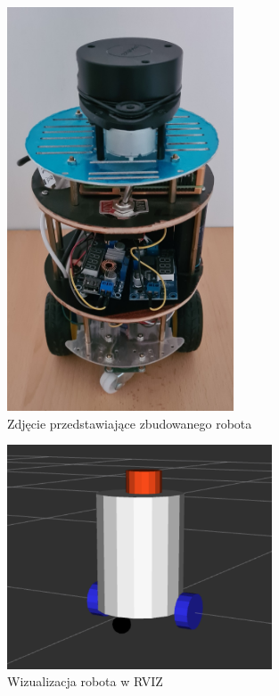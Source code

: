 \documentclass[a4paper,twoside,12pt]{book}
\begin{document}
\begin{figure}[!hb]
	\centering
	\includegraphics[width=0.6\textwidth]{images/robot.jpg}
	\caption{Zdjęcie przedstawiające zbudowanego robota}
	\label{fig:robot-zdj}
	\end{figure}
	\newpage

	\begin{figure}[!hb]
		\centering
		\includegraphics[width=0.7\textwidth]{images/robot-rviz.png}
		\caption{Wizualizacja robota w RVIZ}
		\label{fig:robot-rviz}
		\end{figure}
		
\end{document}
